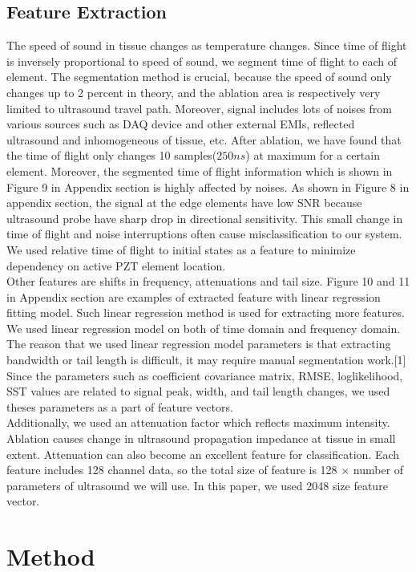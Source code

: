 \documentclass[11pt,letterpaper]{article}
\begin{document}
\subsection{Feature Extraction}
\label{sect:pdf}
The speed of sound in tissue changes as temperature changes. Since time of flight is inversely proportional to speed of sound, we segment time of flight to each of element. The segmentation method is crucial, because the speed of sound only changes up to 2 percent in theory, and the ablation area is respectively very limited to ultrasound travel path. Moreover, signal includes lots of noises from various sources such as DAQ device and other external EMIs, reflected ultrasound and inhomogeneous of tissue, etc. After ablation, we have found that the time of flight only changes 10 samples($250ns$) at maximum for a certain element. Moreover, the segmented time of flight information  which is shown in Figure 9 in Appendix section is highly affected by noises. As shown in Figure 8 in appendix section, the signal at the edge elements have low SNR because ultrasound probe have sharp drop in directional sensitivity. This small change in time of flight and noise interruptions often cause misclassification to our system. We used relative time of flight to initial states as a feature to minimize dependency on active PZT element location. \\
Other features are shifts in frequency, attenuations and tail size. Figure 10 and 11 in Appendix section are examples of extracted feature with linear regression fitting model. Such linear regression method is used for extracting more features. We used linear regression model on both of time domain and frequency domain. The reason that we used linear regression model parameters is that extracting bandwidth or tail length is difficult, it may require manual segmentation work.[1] Since the parameters such as coefficient covariance matrix, RMSE, loglikelihood, SST values are related to signal peak, width, and tail length changes, we used theses parameters as a part of feature vectors.\\
Additionally, we used an attenuation factor which reflects maximum intensity. Ablation causes change in ultrasound propagation impedance at tissue in small extent. Attenuation can also become an excellent feature for classification. Each feature includes 128 channel data, so the total size of feature is 128 $\times$ number of parameters of ultrasound we will use. In this paper, we used 2048 size feature vector. 


\section{Method}
\end{document}
